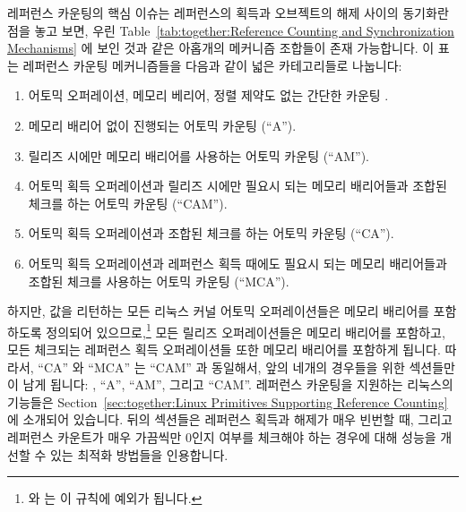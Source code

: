 레퍼런스 카운팅의 핵심 이슈는 레퍼런스의 획득과 오브젝트의 해제 사이의 동기화란
점을 놓고 보면, 우린
Table~\ref{tab:together:Reference Counting and Synchronization Mechanisms} 에
보인 것과 같은 아홉개의 메커니즘 조합들이 존재 가능합니다.
이 표는 레퍼런스 카운팅 메커니즘들을 다음과 같이 넓은 카테고리들로 나눕니다:
\iffalse

Given that the key reference-counting issue
is synchronization between acquisition
of a reference and freeing of the object, we have nine possible
combinations of mechanisms, as shown in
Table~\ref{tab:together:Reference Counting and Synchronization Mechanisms}.
This table
divides reference-counting mechanisms into the following broad categories:
\fi
\begin{enumerate}
\item	어토믹 오퍼레이션, 메모리 베리어, 정렬 제약도 없는 간단한 카운팅
	.
\item	메모리 배리어 없이 진행되는 어토믹 카운팅 (``A'').
\item	릴리즈 시에만 메모리 배리어를 사용하는 어토믹 카운팅 (``AM'').
\item	어토믹 획득 오퍼레이션과 릴리즈 시에만 필요시 되는 메모리 배리어들과
	조합된 체크를 하는 어토믹 카운팅 (``CAM'').
\item	어토믹 획득 오퍼레이션과 조합된 체크를 하는 어토믹 카운팅 (``CA'').
\item	어토믹 획득 오퍼레이션과 레퍼런스 획득 때에도 필요시 되는 메모리
	배리어들과 조합된 체크를 사용하는 어토믹 카운팅 (``MCA'').
\iffalse

\item	Simple counting with neither atomic operations, memory
	barriers, nor alignment constraints \makebox{(``-'')}.
\item	Atomic counting without memory barriers (``A'').
\item	Atomic counting, with memory barriers required only on release
	(``AM'').
\item	Atomic counting with a check combined with the atomic acquisition
	operation, and with memory barriers required only on release
	(``CAM'').
\item	Atomic counting with a check combined with the atomic acquisition
	operation (``CA'').
\item	Atomic counting with a check combined with the atomic acquisition
	operation, and with memory barriers also required on acquisition
	(``MCA'').
\fi
\end{enumerate}
하지만, 값을 리턴하는 모든 리눅스 커널 어토믹 오퍼레이션들은 메모리 배리어를
포함하도록 정의되어 있으므로,\footnote{
	 와  는 이 규칙에 예외가 됩니다.}
모든 릴리즈 오퍼레이션들은 메모리 배리어를 포함하고, 모든 체크되는 레퍼런스
획득 오퍼레이션들 또한 메모리 배리어를 포함하게 됩니다.
따라서, ``CA'' 와 ``MCA'' 는 ``CAM'' 과 동일해서, 앞의 네개의 경우들을 위한
섹션들만이 남게 됩니다:
, ``A'', ``AM'', 그리고 ``CAM''.
레퍼런스 카운팅을 지원하는 리눅스의 기능들은
Section~\ref{sec:together:Linux Primitives Supporting Reference Counting} 에
소개되어 있습니다.
뒤의 섹션들은 레퍼런스 획득과 해제가 매우 빈번할 때, 그리고 레퍼런스 카운트가
매우 가끔씩만 0인지 여부를 체크해야 하는 경우에 대해 성능을 개선할 수 있는
최적화 방법들을 인용합니다.
\iffalse

